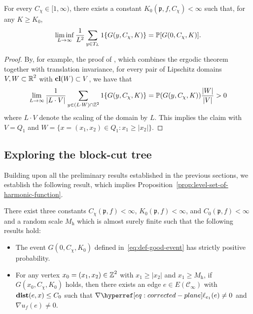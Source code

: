 \documentclass[12pt]{amsart}
\numberwithin{equation}{section}
\begin{document}
	\begin{lemma} \label{lemma:density-bound-good-event}
		For every $C_{\chi} \in [1 , \infty)$, there exists a constant $K_0(\mathfrak{p} , f , C_\chi) < \infty$ such that, for any $K \geq K_0$, 
		\begin{equation*}
			\liminf_{L \to \infty} \frac{1}{L^2}\sum_{y \in T_L}1\{ {G(y , C_\chi , K)}\} =  \P[G(0 , C_\chi , K )].
		\end{equation*}
	\end{lemma}
	\begin{proof}
		By, for example, the proof of \cite[Lemma 3.2]{ergodic-theorem-lemma}, which combines the ergodic theorem together with translation invariance, 
		for every pair of Lipschitz domains $V,W \subset \R^2$ with $\cl(W) \subset V$, we have that 
		\begin{equation} \label{eq:spreads-evenly}
			\lim_{L \to \infty} \frac{1}{|L \cdot V|} \sum_{y \in (L \cdot W) \cap \Z^2} 1\{ {G(y , C_\chi , K)}\}  
			= \P( G(y , C_\chi , K)) \frac{|W|}{|V|}
			> 0
		\end{equation}
		where $L \cdot V$ denote the scaling of the domain by $L$. This implies the claim with $V = Q_1$ and $W = \{ x = (x_1 , x_2) \in Q_1 : x_1 \geq |x_2| \}$.
	\end{proof}
	
	
	
	\subsection{Exploring the block-cut tree}
	Building upon all the preliminary results established in the previous sections, we establish the following result, which implies Proposition~\ref{prop:level-set-of-harmonic-function}.
	\begin{lemma} \label{lemma:large-gradient-implies-not-in-level-set}
		There exist three constants $C_\chi (\mathfrak{p}, f) < \infty$, $K_0(\mathfrak{p} , f) < \infty$, and $C_0(\mathfrak{p} , f) < \infty$ and a random scale $M_{\mathrm{h}}$ which is almost surely finite such that the following results hold:
		\begin{itemize}
			\item[(i)] The event $G(0, C_\chi , K_0)$ defined in~\eqref{eq:def-good-event} has strictly positive probability.
			\item[(ii)] For any vertex $x_0 = (x_1 , x_2) \in \Z^2$ with $x_1 \geq |x_2|$ and $x_1 \geq M_{\mathrm{h}}$, if $G(x_0, C_\chi , K_0)$ holds, then there exists an edge $e \in E \left( \mathscr{C}_\infty \right)$ with $\dist(e , x) \leq C_0$ such that $ \nabla \ellp{e_1} (e) \neq 0$ and $\nabla u_f(e) \neq 0$.
		\end{itemize}
	\end{lemma}
	
\end{document}
